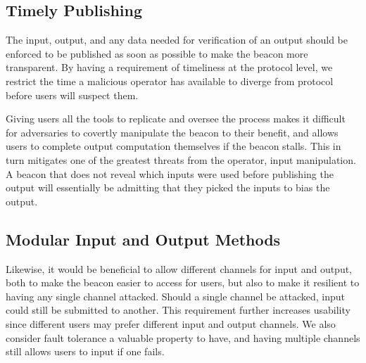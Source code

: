 

\subsection{Timely Publishing}
The input, output, and any data needed for verification of an output should be enforced to be published as soon as possible to make the beacon more transparent.
By having a requirement of timeliness at the protocol level, we restrict the time a malicious operator has available to diverge from protocol before users will suspect them.

Giving users all the tools to replicate and oversee the process makes it difficult for adversaries to covertly manipulate the beacon to their benefit, and allows users to complete output computation themselves if the beacon stalls.
This in turn mitigates one of the greatest threats from the operator, input manipulation.
A beacon that does not reveal which inputs were used before publishing the output will essentially be admitting that they picked the inputs to bias the output.

\subsection{Modular Input and Output Methods}
Likewise, it would be beneficial to allow different channels for input and output, both to make the beacon easier to access for users, but also to make it resilient to having any single channel attacked.
Should a single channel be attacked, input could still be submitted to another.
This requirement further increases usability since different users may prefer different input and output channels.
We also consider fault tolerance a valuable property to have, and having multiple channels still allows users to input if one fails.

